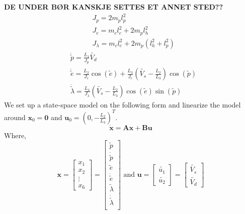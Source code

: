 \textbf{DE UNDER BØR KANSKJE SETTES ET ANNET STED??}
\begin{subequations} \label{eq:moments_inertia}
    \begin{align}
        & J_p = 2 m_p l_p^2 \\
        & J_e = m_c l_c^2 + 2 m_p l_h^2 \\
        & J_\lambda = m_c l_c^2 + 2 m_p (l_h^2 + l_p^2)
    \end{align}
\end{subequations}
\begin{subequations}
    \begin{align}
        & \ddot{\tilde{p}} = \frac{L_1}{J_p} \tilde{V_d} \label{eq:trans_model_pitch}\\
        & \ddot{\tilde{e}} = \frac{L_2}{J_e} \cos(\tilde{e}) + \frac{L_3}{J_e}(\tilde{V_s} - \frac{L_2}{L_3}) \cos(\tilde{p})\label{eq:trans_model_elev} \\
        & \ddot{\tilde{\lambda}} = \frac{L_4}{J_\lambda } (\tilde{V_s}-\frac{L_2}{L_3}) \cos(\tilde{e}) \sin(\tilde{p})\label{eq:trans_model_travel}
    \end{align}
\end{subequations}
We set up a state-space model on the following form and linearize the model around $\mathbf{x}_0 = \mathbf{0}$ and $\mathbf{u}_0 = (0, -\frac{L_2}{L_3})^T$.
\begin{equation*}
    \mathbf{\dot{x}} = \mathbf{Ax} + \mathbf{Bu}
\end{equation*}
Where, 
\begin{equation*}
    \mathbf{x} = 
    \begin{bmatrix}
        x_1 \\ x_2 \\ \vdots \\ x_6
    \end{bmatrix}
    =
    \begin{bmatrix}
        \tilde{p} \\ \dot{\tilde{p}} \\ \tilde{e} \\ \dot{\tilde{e}} \\ \tilde{\lambda} \\ \dot{\tilde{\lambda}} \\ 
    \end{bmatrix}
    \text{ and }
    \mathbf{u} =
    \begin{bmatrix}
        \tilde{u_1} \\ \tilde{u_2}
    \end{bmatrix}
    =
    \begin{bmatrix}
        \tilde{V_s} \\ \tilde{V_d}
    \end{bmatrix}
\end{equation*}
